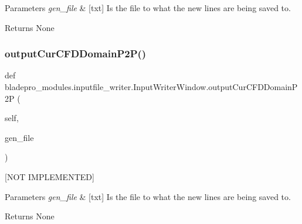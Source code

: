\begin{DoxyParams}{Parameters}
{\em gen\+\_\+file} & \mbox{[}txt\mbox{]} Is the file to what the new lines are being saved to. \\
\hline
\end{DoxyParams}
\begin{DoxyReturn}{Returns}
None 
\end{DoxyReturn}
\hypertarget{classbladepro__modules_1_1inputfile__writer_1_1_input_writer_window_a3b5fc7f417d1912f563df69560f57c2e}{}\label{classbladepro__modules_1_1inputfile__writer_1_1_input_writer_window_a3b5fc7f417d1912f563df69560f57c2e} 
\subsubsection{\texorpdfstring{output\+Cur\+C\+F\+D\+Domain\+P2\+P()}{outputCurCFDDomainP2P()}}
{\footnotesize\ttfamily def bladepro\+\_\+modules.\+inputfile\+\_\+writer.\+Input\+Writer\+Window.\+output\+Cur\+C\+F\+D\+Domain\+P2P (\begin{DoxyParamCaption}\item[{}]{self,  }\item[{}]{gen\+\_\+file }\end{DoxyParamCaption})}



\mbox{[}N\+OT I\+M\+P\+L\+E\+M\+E\+N\+T\+ED\mbox{]} 


\begin{DoxyParams}{Parameters}
{\em gen\+\_\+file} & \mbox{[}txt\mbox{]} Is the file to what the new lines are being saved to. \\
\hline
\end{DoxyParams}
\begin{DoxyReturn}{Returns}
None 
\end{DoxyReturn}
\hypertarget{classbladepro__modules_1_1inputfile__writer_1_1_input_writer_window_a998cb328088bc95e267cffed35c231ce}{}\label{classbladepro__modules_1_1inputfile__writer_1_1_input_writer_window_a998cb328088bc95e267cffed35c231ce} 
